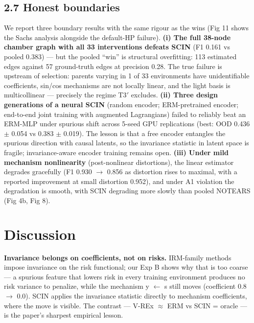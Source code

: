\documentclass[11pt]{article}
\begin{document}
\subsection{2.7 Honest boundaries}\label{results-2.7-honest-boundaries-reviewers-trust-these-nature-demands-them}

We report three boundary results with the same rigour as the wins
(Fig 11 shows the Sachs analysis alongside the default-HP failure).
\textbf{(i) The full 38-node chamber graph with all 33 interventions defeats
SCIN} (F1 0.161 vs pooled 0.383) --- but the pooled ``win'' is structural
overfitting: 113 estimated edges against 57 ground-truth edges at
precision 0.28. The true failure is upstream of selection: parents
varying in 1 of 33 environments have unidentifiable coefficients,
sin/cos mechanisms are not locally linear, and the light basis is
multicollinear --- precisely the regime T3\('\) excludes. \textbf{(ii) Three
design generations of a neural SCIN} (random encoder;
ERM-pretrained encoder; end-to-end joint training with augmented
Lagrangians) failed to reliably beat an ERM-MLP under spurious shift
across 5-seed GPU replications (best: OOD 0.436 \(\pm\) 0.054 vs
0.383 \(\pm\) 0.019). The lesson is that a free encoder entangles the
spurious direction with causal latents, so the invariance statistic in
latent space is fragile; invariance-aware encoder training remains
open. \textbf{(iii) Under mild mechanism nonlinearity} (post-nonlinear
distortions), the linear estimator degrades gracefully (F1 0.930 \(\rightarrow\)
0.856 as distortion rises to maximal, with a reported improvement at
small distortion 0.952), and under A1 violation the degradation is
smooth, with SCIN degrading more slowly than pooled NOTEARS (Fig 4b,
Fig 8).

\section{Discussion }

\textbf{Invariance belongs on coefficients, not on risks.} IRM-family
methods impose invariance on the risk functional; our Exp B shows why
that is too coarse --- a spurious feature that lowers risk in every
training environment produces no risk variance to penalize, while the
mechanism y \(\leftarrow\) s still moves (coefficient 0.8 \(\rightarrow\) 0.0). SCIN applies the
invariance statistic directly to mechanism coefficients, where the
move is visible. The contrast --- V-REx \(\approx\) ERM vs SCIN = oracle --- is the
paper's sharpest empirical lesson.
\end{document}

